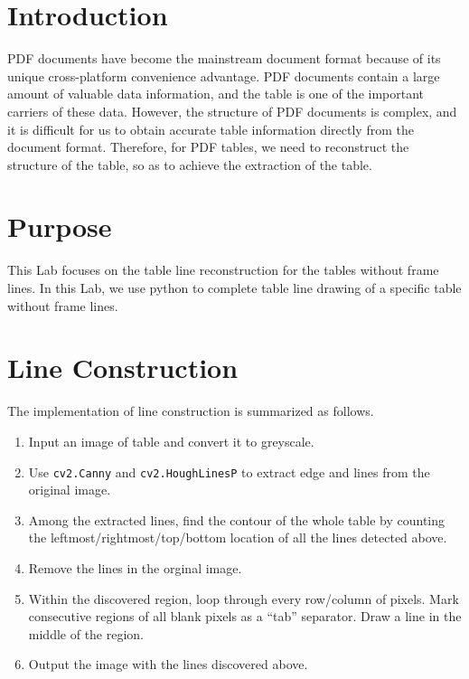 \section{Introduction}

PDF documents have become the mainstream document format because of its unique cross-platform convenience advantage. PDF documents contain a large amount of valuable data information, and the table is one of the important carriers of these data. However, the structure of PDF documents is complex, and it is difficult for us to obtain accurate table information directly from the document format. Therefore, for PDF tables, we need to reconstruct the structure of the table, so as to achieve the extraction of the table.

\section{Purpose}

This Lab focuses on the table line reconstruction for the tables without frame lines. In this Lab, we use python to complete table line drawing of a specific table without frame lines.


\section{Line Construction}

The implementation of line construction is summarized as follows.

\begin{enumerate}
    \item Input an image of table and convert it to greyscale.
    \item \label{step:extract}Use \texttt{cv2.Canny} and \texttt{cv2.HoughLinesP} to extract edge and lines from the original image.
    \item \label{step:line}Among the extracted lines, find the contour of the whole table by counting the leftmost/rightmost/top/bottom location of all the lines detected above.
    \item Remove the lines in the orginal image.
    \item \label{step:draw}Within the discovered region, loop through every row/column of pixels. Mark consecutive regions of all blank pixels as a ``tab'' separator. Draw a line in the middle of the region.
    \item Output the image with the lines discovered above.
\end{enumerate}

